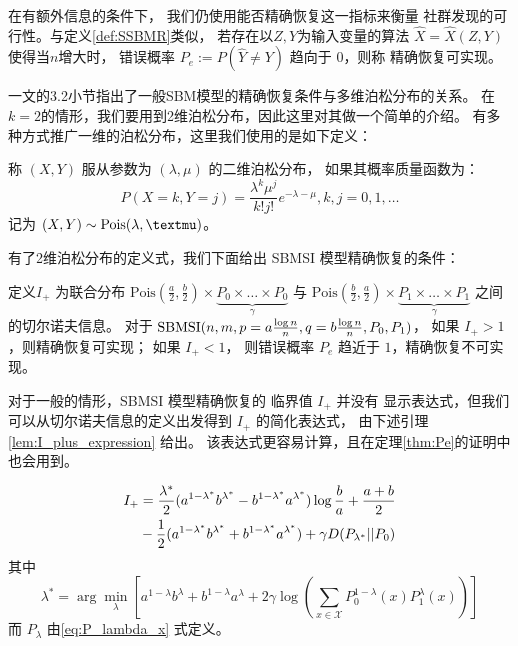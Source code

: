  在有额外信息的条件下，
 我们仍使用能否精确恢复这一指标来衡量
 社群发现的可行性。与定义\ref{def:SSBMR}类似，
 若存在以$Z,Y$为输入变量的算法 $\hat{X}=\hat{X}(Z,Y)$
 使得当$n$增大时，
 错误概率
 $P_e:=P(\hat{Y} \neq Y)$ 趋向于 $0$，则称
 精确恢复可实现。

 \citet{abbe2015community}一文的3.2小节指出了一般SBM模型的精确恢复条件与多维泊松分布的关系。
在$k=2$的情形，我们要用到2维泊松分布，因此这里对其做一个简单的介绍。
有多种方式推广一维的泊松分布，这里我们使用的是如下定义：

\begin{definition}
    称 $(X,Y)$ 服从参数为 $(\lambda, \mu)$ 的二维泊松分布，
    如果其概率质量函数为：
    \begin{equation}
        P(X=k, Y=j) = \frac{\lambda^k \mu^j}{k! j!}
        e^{-\lambda - \mu}, k,j=0,1,\dots
    \end{equation}
    记为 $(X,Y) \sim \Pois(\lambda, \mu)$。
\end{definition}

有了2维泊松分布的定义式，我们下面给出
SBMSI 模型精确恢复的条件：
\begin{theorem}\label{thm:Pe}
    定义$I_+$ 为联合分布 $\textrm{Pois}(\frac{a}{2},\frac{b}{2})\times \underbrace{P_0 \times \dots \times P_0}_{\gamma}$
    与 $\textrm{Pois}(\frac{b}{2}, \frac{a}{2})\times \underbrace{P_1 \times \dots \times P_1}_{\gamma}$ 
    之间的切尔诺夫信息。    
    对于 $\operatorname{SBMSI}(n,m,p=a\frac{\log n}{n},q=b\frac{\log n}{n},P_0,P_1)$，
    如果 $I_+>1$，则精确恢复可实现；
    如果 $I_+ < 1$，
    则错误概率 $P_e$ 趋近于 $1$，精确恢复不可实现。
\end{theorem}
对于一般的情形，SBMSI 模型精确恢复的 临界值 $I_+$ 并没有
显示表达式，但我们可以从切尔诺夫信息的定义出发得到 $I_+$ 的简化表达式，
由下述引理 \ref{lem:I_plus_expression} 给出。
该表达式更容易计算，且在定理\ref{thm:Pe}的证明中也会用到。

\begin{lemma}\label{lem:I_plus_expression}
\begin{align}\label{equation:I+}
    I_+ &=\frac{\lambda^* }{2} (a^{1-\lambda^* }b^{\lambda^* } -
    b^{1-\lambda^* }a^{\lambda^* })\log\frac{b}{a}+\frac{a+b}{2}\notag \\
    &-\frac{1}{2}(a^{1-\lambda^*}b^{\lambda^*} +
    b^{1-\lambda^* }a^{\lambda^* })+\gamma D(P_{\lambda^* }||P_0) 
	\end{align}
	其中
	\begin{equation}\label{eq:lambda}
    \lambda^* = \arg\min_{\lambda} \left[a^{1-\lambda}b^{\lambda} +
    b^{1-\lambda}a^{\lambda} + 2\gamma \log
    \left(\sum_{x\in \mathcal{X}}P^{1-\lambda}_0(x) P^{\lambda}_1(x)
    \right)
    \right]
\end{equation}
而 $P_{\lambda}$ 由\eqref{eq:P_lambda_x} 式定义。
\end{lemma}



